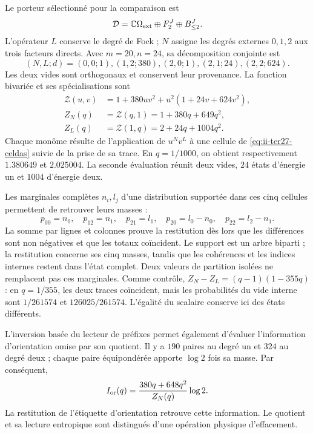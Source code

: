 Le porteur sélectionné pour la comparaison est
\[
 \mathcal D=\mathbb C\Omega_{\rm ext}\oplus F_2^J\oplus B_{\leq2}^J.
\]
L’opérateur $L$ conserve le degré de Fock ; $N$ assigne les degrés externes
$0,1,2$ aux trois facteurs directs. Avec $m=20,n=24$, sa décomposition conjointe est
\begin{equation}
 (N,L;d)=(0,0;1),(1,2;380),(2,0;1),(2,1;24),(2,2;624).
 \label{eq:ii-ter27-celdas}
\end{equation}
Les deux vides sont orthogonaux et conservent leur provenance. La fonction
bivariée et ses spécialisations sont
\begin{align}
 \mathcal Z(u,v)&=1+380uv^2+u^2(1+24v+624v^2),\\
 Z_N(q)&=\mathcal Z(q,1)=1+380q+649q^2,\\
 Z_L(q)&=\mathcal Z(1,q)=2+24q+1004q^2.
 \label{eq:ii-ter27-particiones}
\end{align}
Chaque monôme résulte de l’application de $u^Nv^L$ à une cellule de
\eqref{eq:ii-ter27-celdas} suivie de la prise de sa trace. En $q=1/1000$, on obtient
respectivement $1.380649$ et $2.025004$. La seconde évaluation réunit deux
vides, $24$ états d’énergie un et $1004$ d’énergie deux.

Les marginales complètes $n_i,l_j$ d’une distribution supportée dans
ces cinq cellules permettent de retrouver leurs masses :
\[
 p_{00}=n_0,\quad p_{12}=n_1,\quad p_{21}=l_1,
 \quad p_{20}=l_0-n_0,\quad p_{22}=l_2-n_1.
\]
La somme par lignes et colonnes prouve la restitution dès lors que les
différences sont non négatives et que les totaux coïncident. Le support est un
arbre biparti ; la restitution concerne ses cinq masses, tandis que
les cohérences et les indices internes restent dans l’état complet.
Deux valeurs de partition isolées ne remplacent pas ces marginales. Comme
contrôle, $Z_N-Z_L=(q-1)(1-355q)$ : en $q=1/355$, les deux traces coïncident,
mais les probabilités du vide interne sont $1/261574$ et
$126025/261574$. L’égalité du scalaire conserve ici des états différents.

L’inversion basée du lecteur de préfixes permet également d’évaluer
l’information d’orientation omise par son quotient. Il y a $190$ paires au
degré un et $324$ au degré deux ; chaque paire équipondérée apporte $\log2$
fois sa masse. Par conséquent,
\[
 I_{\rm or}(q)=\frac{380q+648q^2}{Z_N(q)}\log2.
\]
La restitution de l’étiquette d’orientation retrouve cette information.
Le quotient et sa lecture entropique sont distingués d’une opération
physique d’effacement.


